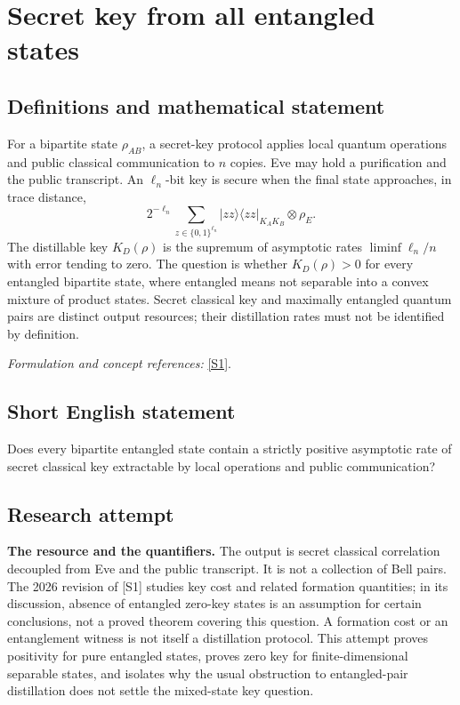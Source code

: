 \documentclass[11pt]{article}
\begin{document}
\section*{\texorpdfstring{Secret key from all entangled states}{Secret key from all entangled states}}\label{300}
\subsection{Definitions and mathematical statement}
For a bipartite state $\rho_{AB}$, a secret-key protocol applies local quantum operations and public classical communication to $n$ copies. Eve may hold a purification and the public transcript. An $\ell_n$-bit key is secure when the final state approaches, in trace distance,
\[
 2^{-\ell_n}\sum_{z\in\{0,1\}^{\ell_n}}|zz\rangle\langle zz|_{K_AK_B}\otimes\rho_E.
\]
The distillable key $K_D(\rho)$ is the supremum of asymptotic rates $\liminf\ell_n/n$ with error tending to zero. The question is whether $K_D(\rho)>0$ for every entangled bipartite state, where entangled means not separable into a convex mixture of product states. Secret classical key and maximally entangled quantum pairs are distinct output resources; their distillation rates must not be identified by definition.
\par\smallskip\textit{Formulation and concept references:} \href{https://arxiv.org/html/2402.17007}{[S1]}.

\subsection{Short English statement}
Does every bipartite entangled state contain a strictly positive asymptotic rate of secret classical key extractable by local operations and public communication?
\subsection{Research attempt}
\textbf{The resource and the quantifiers.}
The output is secret classical correlation decoupled from Eve and the public
transcript.  It is not a collection of Bell pairs.  The 2026 revision of [S1]
studies key cost and related formation quantities; in its discussion, absence
of entangled zero-key states is an assumption for certain conclusions, not a
proved theorem covering this question.  A formation cost or an entanglement
witness is not itself a distillation protocol.  This attempt proves positivity
for pure entangled states, proves zero key for finite-dimensional separable
states, and isolates why the usual obstruction to entangled-pair distillation
does not settle the mixed-state key question.
\end{document}
